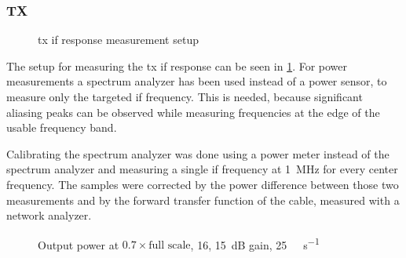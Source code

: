 \documentclass[12pt,a4paper,parskip=full,abstracton]{scrartcl}
\begin{document}
\subsubsection{TX}
\label{sec:iftx}
\begin{figure}[htb]
    \centering
    \caption{\gls{tx} \gls{if} response measurement setup}
    \label{fig:txifsetup}
\end{figure}

The setup for measuring the \gls{tx} \gls{if} response can be seen in
\cref{fig:txifsetup}. For power measurements a spectrum analyzer has been used
instead of a power sensor, to measure only the targeted \gls{if} frequency. This
is needed, because significant aliasing peaks can be observed while measuring
frequencies at the edge of the usable frequency band.

Calibrating the spectrum analyzer was done using a power meter instead of the
spectrum analyzer and measuring a single \gls{if} frequency at
\SI{1}{\mega\hertz} for every center frequency. The samples were corrected
by the power difference between those two measurements and by the forward
transfer function of the cable, measured with a network analyzer.

\begin{figure}[htb]
    \centering
{}
\caption{Output power at $0.7 \times \text{full scale}$, \SI{16}{\bit}, \SI{15}{\deci\bel} gain, \SI{25}{\mega\samples\per\second}}
    \label{fig:rfiftx16}
\end{figure}
\end{document}

